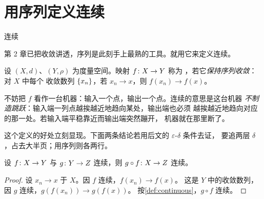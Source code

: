\section{用序列定义连续}
\label{sec:seq-continuity}

\begin{concept}{连续}
\end{concept}

第 2 章已把收敛讲透，序列是此刻手上最熟的工具。就用它来定义连续。

\begin{definition}[连续]
  \label{def:continuous}
  设 \((X,d)\)、\((Y,\rho)\) 为度量空间。映射 \(f \colon X \to Y\) 称为%
  ，若它\emph{保持序列收敛}：对 \(X\) 中每个
  收敛数列 \(\{x_{n}\}\)，若 \(x_{n} \to x\)，则 \(f(x_{n}) \to f(x)\)。
\end{definition}

\begin{intuition}
  不妨把 \(f\) 看作一台机器：输入一个点，输出一个点。连续的意思是这台机器%
  \emph{不制造跳跃}：输入端一列点越挨越近地趋向某处，输出端也必须
  越挨越近地趋向对应的那一处。若输入端平稳靠近而输出端突然蹦开，
  机器就在那里断了。
\end{intuition}

这个定义的好处立刻显现。下面两条结论若用后文的 \(\varepsilon\)-\(\delta\) 条件去证，
要追两层 \(\delta\)，占去大半页；用序列则各两行。

\begin{theorem}[复合]
  \label{thm:composite-continuous}
  设 \(f \colon X \to Y\) 与 \(g \colon Y \to Z\) 连续，则
  \(g \circ f \colon X \to Z\) 连续。
\end{theorem}

\begin{proof}
  设 \(x_{n} \to x\) 于 \(X\)。因 \(f\) 连续，\(f(x_{n}) \to f(x)\)。
  这是 \(Y\) 中的收敛数列，因 \(g\) 连续，\(g(f(x_{n})) \to g(f(x))\)。
  按\cref{def:continuous}，\(g \circ f\) 连续。
\end{proof}

